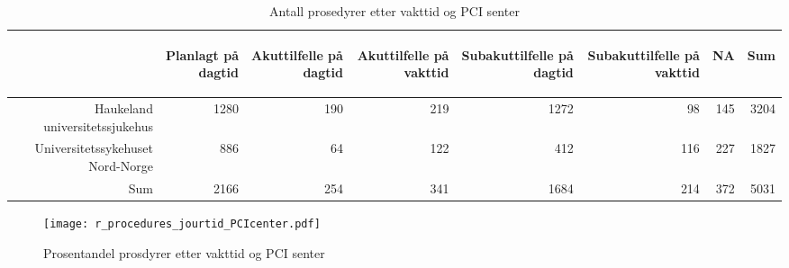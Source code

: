 \documentclass[norsk, a4paper]{report}
\begin{document}
\begin{tiny}
\begin{table}[ht]
\centering
\begin{tabular}{rrrrrrrr}
  \toprule
 & \begin{sideways} Planlagt på dagtid \end{sideways} & \begin{sideways} Akuttilfelle på dagtid \end{sideways} & \begin{sideways} Akuttilfelle på vakttid \end{sideways} & \begin{sideways} Subakuttilfelle på dagtid \end{sideways} & \begin{sideways} Subakuttilfelle på vakttid \end{sideways} & \begin{sideways} NA \end{sideways} & \begin{sideways} Sum \end{sideways} \\ 
  \midrule
Haukeland universitetssjukehus & 1280 & 190 & 219 & 1272 & 98 & 145 & 3204 \\ 
  Universitetssykehuset Nord-Norge & 886 & 64 & 122 & 412 & 116 & 227 & 1827 \\ 
  Sum & 2166 & 254 & 341 & 1684 & 214 & 372 & 5031 \\ 
   \bottomrule
\end{tabular}
\caption{Antall prosedyrer etter vakttid og PCI senter} 
\end{table}\end{tiny}

\clearpage


\begin{figure}[ht]
  \centering
\texttt{[image: r\_procedures\_jourtid\_PCIcenter.pdf]}  \caption{Prosentandel prosdyrer etter vakttid og PCI senter}
\end{figure}
\end{document}
